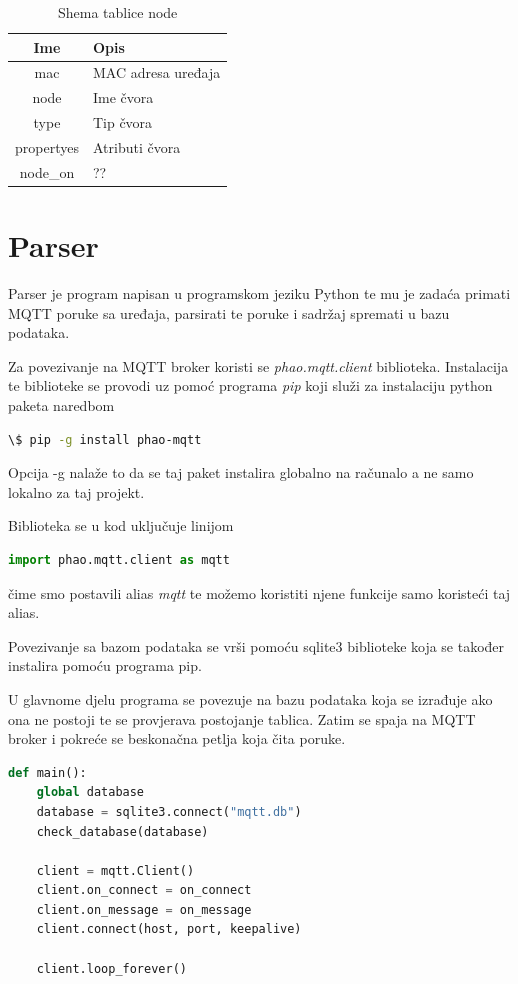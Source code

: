 \documentclass[times, utf8, zavrsni]{fer}
\begin{document}
\begin{table}[h]
    \begin{tabular}{ |c|l| }
        \hline
        Ime & Opis\\
        \hline
        mac & MAC adresa uređaja\\
        \hline
        node & Ime čvora\\
        \hline
        type & Tip čvora\\
        \hline
        propertyes & Atributi čvora\\
        \hline
        node\_on & ??\\
        \hline
    \end{tabular}
    \caption{Shema tablice node}
\end{table}

\section{Parser}
Parser je program napisan u programskom jeziku Python te mu je zadaća primati MQTT poruke sa uređaja, parsirati te poruke i sadržaj spremati u bazu podataka.

Za povezivanje na MQTT broker koristi se \textit{phao.mqtt.client} biblioteka.
Instalacija te biblioteke se provodi uz pomoć programa \textit{pip} koji služi za instalaciju python paketa naredbom
\begin{lstlisting}[language=Bash]
    \$ pip -g install phao-mqtt
\end{lstlisting}
Opcija -g nalaže to da se taj paket instalira globalno na računalo a ne samo lokalno za taj projekt.

Biblioteka se u kod uključuje linijom
\begin{lstlisting}[language=Python]
    import phao.mqtt.client as mqtt
\end{lstlisting}
čime smo postavili alias \textit{mqtt} te možemo koristiti njene funkcije samo koristeći taj alias.

Povezivanje sa bazom podataka se vrši pomoću sqlite3 biblioteke koja se također instalira pomoću programa pip.

U glavnome djelu programa se povezuje na bazu podataka koja se izrađuje ako ona ne postoji te se provjerava postojanje tablica.
Zatim se spaja na MQTT broker i pokreće se beskonačna petlja koja čita poruke.
\begin{lstlisting}[language=Python, caption=Main funkcija programskog koda]
def main():
    global database
    database = sqlite3.connect("mqtt.db")
    check_database(database)

    client = mqtt.Client()
    client.on_connect = on_connect
    client.on_message = on_message
    client.connect(host, port, keepalive)

    client.loop_forever()
\end{lstlisting}
\end{document}
